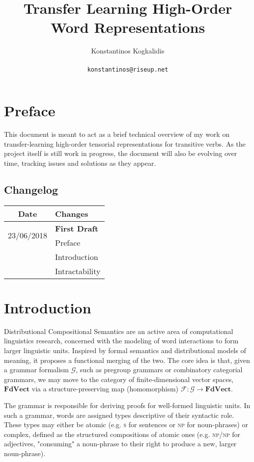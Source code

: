 \documentclass[a4paper,11pt]{article}
\title{Transfer Learning High-Order Word Representations}
\date{}
\author{Konstantinos Kogkalidis\\
       \\
       \texttt{konstantinos@riseup.net}
}
\begin{document}
\maketitle

\section{Preface}
This document is meant to act as a brief technical overview of my work on transfer-learning high-order tensorial representations for transitive verbs. As the project itself is still work in progress, the document will also be evolving over time, tracking issues and solutions as they appear. 

\subsection{Changelog}
    \begin{tabularx}{\linewidth}{|c|X|}
      \toprule
      \textbf{Date} & \textbf{Changes} \\
      \midrule
      \multirow{2}{*}{23/06/2018} &  \textbf{First Draft} \\
       & \quad Preface \\
       & \quad Introduction \\
       & \quad Intractability \\
       \midrule
    \end{tabularx}
    
\section{Introduction}
Distributional Compositional Semantics are an active area of computational linguistics research, concerned with the modeling of word interactions to form larger linguistic units. Inspired by formal semantics and distributional models of meaning, it proposes a functional merging of the two. The core idea is that, given a grammar formalism $\mathcal{G}$, such as pregroup grammars or combinatory categorial grammars, we may move to the category of finite-dimensional vector spaces, $\mathbf{FdVect}$ via a structure-preserving map (homomorphism) $\mathcal{F}: \mathcal{G} \to \mathbf{FdVect}$.

The grammar is responsible for deriving proofs for well-formed linguistic units. In such a grammar, words are assigned types descriptive of their syntactic role. These types may either be atomic (e.g. \textsc{s} for sentences or \textsc{np} for noun-phrases) or complex, defined as the structured compositions of atomic ones (e.g. \textsc{np}/\textsc{np} for adjectives, "consuming" a noun-phrase to their right to produce a new, larger noun-phrase).
\end{document}
